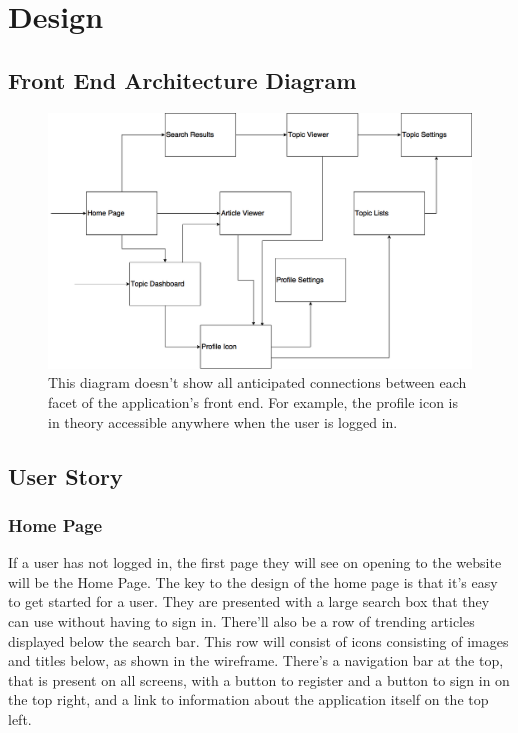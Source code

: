 \documentclass[12pt]{article}
\begin{document}

\newpage

\section{Design}

\subsection{Front End Architecture Diagram}

\begin{figure}[H]
  \centering
    \includegraphics[scale=0.4]{FrontEndArchitecture.png}
   \caption[A basic diagram of the expected architecture of the front end]{This diagram doesn't show all anticipated connections between each facet of the application's front end. For example, the profile icon is in theory accessible anywhere when the user is logged in.}
   \label{frontEndArchitecture}
\end{figure}

\subsection{User Story}

\subsubsection{Home Page}

If a user has not logged in, the first page they will see on opening to the website will be the Home Page. The key to the design of the home page is that it's easy to get started for a user. They are presented with a large search box that they can use without having to sign in. There'll also be a row of trending articles displayed below the search bar. This row will consist of icons consisting of images and titles below, as shown in the wireframe. There's a navigation bar at the top, that is present on all screens, with a button to register and a button to sign in on the top right, and a link to information about the application itself on the top left.
\end{document}
